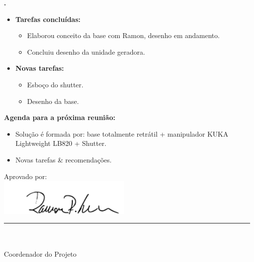   \textbf{.} 
	\begin{itemize}
		\item \textbf{Tarefas concluídas:}
			\begin{itemize}    
				\item Elaborou conceito da base com Ramon, desenho em andamento.
				\item Concluiu desenho da unidade geradora.
			\end{itemize}
		
		\item \textbf{Novas tarefas:}
			\begin{itemize} 
			    \item Esboço do shutter.
			    \item Desenho da base.
			\end{itemize}
	\end{itemize}
			



\textbf{Agenda para a próxima reunião:}
  \begin{itemize}
    \item Solução é formada por: base totalmente retrátil + manipulador KUKA
    Lightweight LB820 + Shutter.
    \item Novas tarefas \& recomendações.
  \end{itemize}


\vspace{5mm}%
\parbox[t]{70mm}{
  Aprovado por: \\[5mm]
  \centering
  \includegraphics[width=65mm]{figs/logo/assinatura-ramon.png} \\[-4mm]
  \rule[2mm]{70mm}{0.1mm} \\
  \ramon \\[1mm]
  Coordenador do Projeto \\
}

\fim